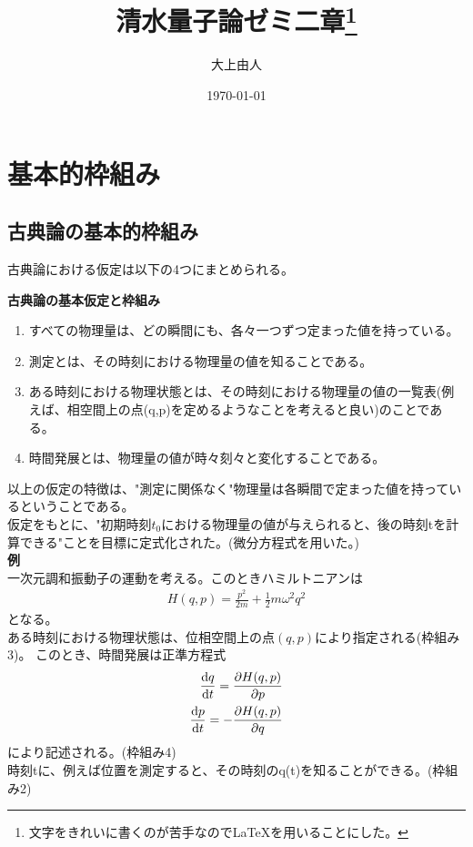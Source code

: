 \documentclass[a4paper,11pt]{jsarticle}
\begin{document}
\title{清水量子論ゼミ二章\footnote{文字をきれいに書くのが苦手なので\LaTeX を用いることにした。}}
\author{大上由人}
\date{\today}
\maketitle

\section{基本的枠組み}

\subsection{古典論の基本的枠組み}
古典論における仮定は以下の4つにまとめられる。

\begin{itembox}[l]{\textbf{古典論の基本仮定と枠組み}}
  \begin{enumerate}
 \item すべての物理量は、どの瞬間にも、各々一つずつ定まった値を持っている。\\
 \item  測定とは、その時刻における物理量の値を知ることである。\\
 \item ある時刻における物理状態とは、その時刻における物理量の値の一覧表(例えば、相空間上の点(q,p)を定めるようなことを考えると良い)のことである。\\
 \item 時間発展とは、物理量の値が時々刻々と変化することである。
  \end{enumerate}
\end{itembox}
以上の仮定の特徴は、"測定に関係なく"物理量は各瞬間で定まった値を持っているということである。\\
仮定をもとに、"初期時刻$t_0$における物理量の値が与えられると、後の時刻tを計算できる"ことを目標に定式化された。(微分方程式を用いた。)\\
\textbf{例}\\
一次元調和振動子の運動を考える。このときハミルトニアンは\\
\begin{align}
H(q,p)=\frac{p^2}{2m}+\frac{1}{2}m\omega ^2 q^2
\end{align}
となる。\\
ある時刻における物理状態は、位相空間上の点$(q,p)$により指定される(枠組み3)。
このとき、時間発展は正準方程式
\begin{align}
\dv{q}{t}=\pdv{H(q,p)}{p}\\
\dv{p}{t}=-\pdv{H(q,p)}{q}
\end{align}
により記述される。(枠組み4)\\
時刻tに、例えば位置を測定すると、その時刻のq(t)を知ることができる。(枠組み2)
\bigskip
\end{document}
